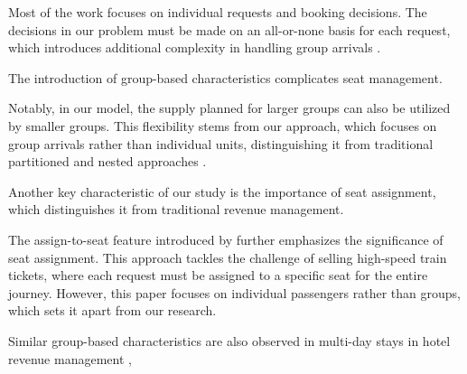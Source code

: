 Most of the work focuses on individual requests and booking decisions. The decisions in our problem must be made on an all-or-none basis for each request, which introduces additional complexity in handling group arrivals \citep{talluri2006theory}. 

The introduction of group-based characteristics complicates seat management. 

Notably, in our model, the supply planned for larger groups can also be utilized by smaller groups. This flexibility stems from our approach, which focuses on group arrivals rather than individual units, distinguishing it from traditional partitioned and nested approaches \citep{curry1990optimal, van2008simulation}.


Another key characteristic of our study is the importance of seat assignment, which distinguishes it from traditional revenue management. 





The assign-to-seat feature introduced by \citet{zhu2023assign} further emphasizes the significance of seat assignment. This approach tackles the challenge of selling high-speed train tickets, where each request must be assigned to a specific seat for the entire journey. However, this paper focuses on individual passengers rather than groups, which sets it apart from our research.


Similar group-based characteristics are also observed in multi-day stays in hotel revenue management \citep{aydin2018decomposition, bitran1995application}, 




\newpage
